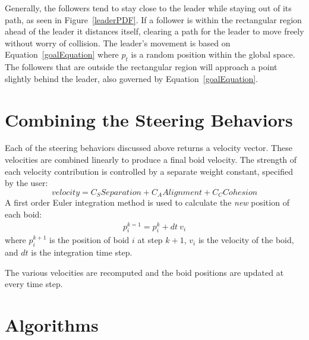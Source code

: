 Generally, the followers tend to stay close to the leader while staying
out of its path, as seen in Figure~\ref{leaderPDF}.  
If a follower is within the rectangular region ahead of the leader 
it distances itself, clearing a path for the leader to move freely 
without worry of collision. The leader's movement is  based on 
Equation~\ref{goalEquation} where $p_t$ is a random position within the 
global space. The followers that are outside the rectangular region 
will approach a point slightly behind the leader, also governed by 
Equation~\ref{goalEquation}.

\section{Combining the Steering Behaviors}
Each of the steering behaviors discussed above returns a velocity vector. These
velocities are combined linearly to produce a final boid velocity. The 
strength of each velocity contribution is controlled by a separate
weight constant, specified by the user: 
%
\begin{equation}
\label{combine}
velocity = C_S Separation  + C_A Alignment  + C_C Cohesion 
\end{equation}
A first order Euler integration method is used  to calculate 
the \textit{new} position of each boid: 
\begin{align}
\label{integrate}
p_i^{k=1} = p_i^k + dt~ v_i
\end{align}
where $p_i^{k+1}$ is the position of boid $i$ at step $k+1$, 
$v_i$ is the velocity of the boid, and $dt$ is the integration time step. 

The various velocities are recomputed and the boid positions are updated at every time step. 

\section{Algorithms}

